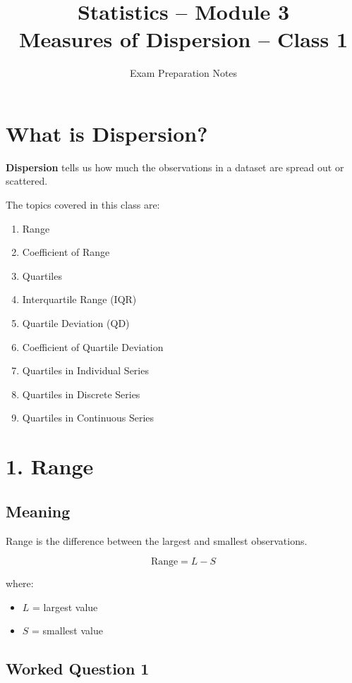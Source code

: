 \documentclass[12pt,a4paper]{article}
\title{\textbf{Statistics -- Module 3}\\
\Large Measures of Dispersion -- Class 1}
\author{Exam Preparation Notes}
\date{}
\newcommand{\boxformula}[1]{%
\[
\boxed{\displaystyle #1}
\]
}
\begin{document}
\maketitle

\section*{What is Dispersion?}

\textbf{Dispersion} tells us how much the observations in a dataset are
spread out or scattered.

The topics covered in this class are:

\begin{enumerate}
    \item Range
    \item Coefficient of Range
    \item Quartiles
    \item Interquartile Range (IQR)
    \item Quartile Deviation (QD)
    \item Coefficient of Quartile Deviation
    \item Quartiles in Individual Series
    \item Quartiles in Discrete Series
    \item Quartiles in Continuous Series
\end{enumerate}

\section{1. Range}

\subsection*{Meaning}

Range is the difference between the largest and smallest observations.

\boxformula{\text{Range}=L-S}

where:
\begin{itemize}
    \item $L$ = largest value
    \item $S$ = smallest value
\end{itemize}

\subsection*{Worked Question 1}
\end{document}
